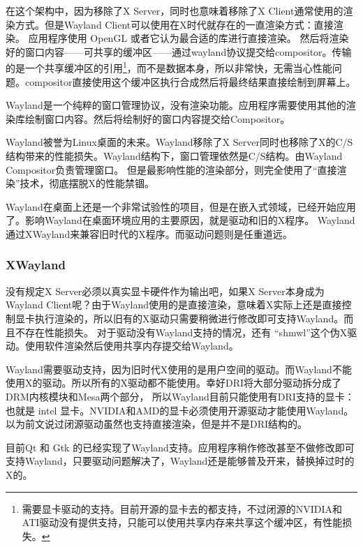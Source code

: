 在这个架构中，因为移除了X Server，同时也意味着移除了X Client通常使用的渲染方式。但是Wayland Client可以使用在X时代就存在的一直渲染方式：直接渲染。
应用程序使用 OpenGL 或者它认为最合适的库进行直接渲染。
然后将渲染好的窗口内容——可共享的缓冲区——通过wayland协议提交给compositor。传输的是一个共享缓冲区的引用\footnote{需要显卡驱动的支持。目前开源的显卡去的都支持，不过闭源的NVIDIA和ATI驱动没有提供支持，只能可以使用共享内存来共享这个缓冲区，有性能损失。}，而不是数据本身，所以非常快，无需当心性能问题。compositor直接使用这个缓冲区执行合成然后将最终结果直接绘制到屏幕上。

Wayland是一个纯粹的窗口管理协议，没有渲染功能。应用程序需要使用其他的渲染库绘制窗口内容。然后将绘制好的窗口内容提交给Compositor。

Wayland被誉为Linux桌面的未来。Wayland移除了X Server同时也移除了X的C/S结构带来的性能损失。Wayland结构下，窗口管理依然是C/S结构。由Wayland Compositor负责管理窗口。
但是最影响性能的渲染部分，则完全使用了“直接渲染”技术，彻底摆脱X的性能禁锢。

Wayland在桌面上还是一个非常试验性的项目，但是在嵌入式领域，已经开始应用了。影响Wayland在桌面环境应用的主要原因，就是驱动和旧的X程序。
Wayland通过XWayland来兼容旧时代的X程序。而驱动问题则是任重道远。

\begin{insertnote}
\subsubsection*{XWayland}

没有规定X Server必须以真实显卡硬件作为输出吧，如果X Server本身成为Wayland Client呢？由于Wayland使用的是直接渲染，意味着X实际上还是直接控制显卡执行渲染的，所以旧有的X驱动只需要稍微进行修改即可支持Wayland。而且不存在性能损失。
对于驱动没有Wayland支持的情况，还有 “shmwl”这个伪X驱动。使用软件渲染然后使用共享内存提交给Wayland。

\end{insertnote}

Wayland需要驱动支持，因为旧时代X使用的是用户空间的驱动。而Wayland不能使用X的驱动。所以所有的X驱动都不能使用。幸好DRI将大部分驱动拆分成了DRM内核模块和Mesa两个部分，
所以Wayland目前只能使用有DRI支持的显卡：也就是 intel 显卡。NVIDIA和AMD的显卡必须使用开源驱动才能使用Wayland。以为前文说过闭源驱动虽然也支持直接渲染，但是并不是DRI结构的。

目前Qt 和 Gtk 的已经实现了Wayland支持。应用程序稍作修改甚至不做修改即可支持Wayland，只要驱动问题解决了，Wayland还是能够普及开来，替换掉过时的X的。

